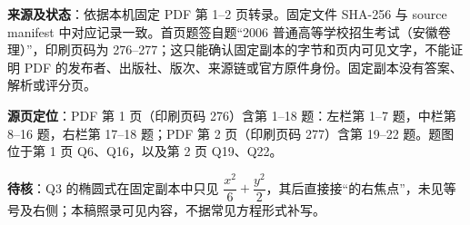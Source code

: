 

\begin{gktip}
\textbf{来源及状态}：依据本机固定 PDF 第 1–2 页转录。固定文件 SHA-256 与 source manifest 中对应记录一致。首页题签自题“2006 普通高等学校招生考试（安徽卷理）”，印刷页码为 276–277；这只能确认固定副本的字节和页内可见文字，不能证明 PDF 的发布者、出版社、版次、来源链或官方原件身份。固定副本没有答案、解析或评分页。

\textbf{源页定位}：PDF 第 1 页（印刷页码 276）含第 1–18 题：左栏第 1–7 题，中栏第 8–16 题，右栏第 17–18 题；PDF 第 2 页（印刷页码 277）含第 19–22 题。题图位于第 1 页 Q6、Q16，以及第 2 页 Q19、Q22。

\textbf{待核}：Q3 的椭圆式在固定副本中只见 $\dfrac{x^2}{6}+\dfrac{y^2}{2}$，其后直接接“的右焦点”，未见等号及右侧；本稿照录可见内容，不据常见方程形式补写。
\end{gktip}


